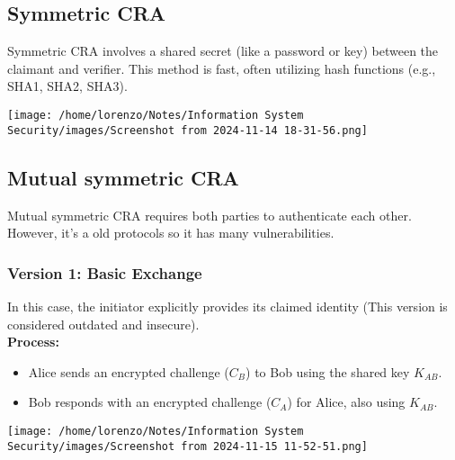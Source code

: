 \subsection{Symmetric CRA}
\begin{minipage}{0.3\textwidth}
    \vspace{-0.9cm}
    Symmetric CRA involves a shared secret (like a password or key) between 
    the claimant and verifier. This method is fast, often utilizing hash 
    functions (e.g., SHA1, SHA2, SHA3).
\end{minipage} 
\hspace{0.001cm}
\begin{minipage}{0.7\textwidth}
    \centering
    \texttt{[image: /home/lorenzo/Notes/Information System Security/images/Screenshot from 2024-11-14 18-31-56.png]}
\end{minipage}

\subsection{Mutual symmetric CRA}
Mutual symmetric CRA requires both parties to authenticate each other.
However, it's a old protocols so it has many vulnerabilities.

\subsubsection{Version 1: Basic Exchange}
\begin{minipage}{0.5\textwidth}
In this case, the initiator explicitly provides its claimed identity (This version is considered outdated and insecure).
\\\textbf{Process:} 
\begin{itemize}
    \item Alice sends an encrypted challenge (\(C_B\)) to Bob using the shared key \(K_{AB}\).
    \item Bob responds with an encrypted challenge (\(C_A\)) for Alice, also using \(K_{AB}\).
\end{itemize}
\end{minipage} 
\hspace{0cm}
\begin{minipage}{0.5\textwidth}
    \centering
    \texttt{[image: /home/lorenzo/Notes/Information System Security/images/Screenshot from 2024-11-15 11-52-51.png]}
\end{minipage}

